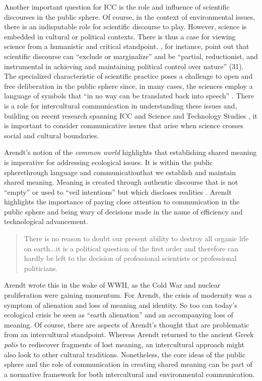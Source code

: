 Another important question for ICC is the role and influence of scientific discourses in the public sphere. Of course, in the context of environmental issues, there is an indisputable role for scientific discourse to play. However, science is embedded in cultural or political contexts. There is thus a case for viewing science from a humanistic and critical standpoint. \cite*{Peet2011}, for instance, point out that scientific discourse can ``exclude or marginalize'' and be ``partial, reductionist, and instrumental in achieving and maintaining political control over nature'' (31). The specialized characteristic of scientific practice poses a challenge to open and free deliberation in the public sphere since, in many cases, the sciences employ a language of symbols that ``in no way can be translated back into speech'' \citep[4]{Arendt1958a}. There is a role for intercultural communication in understanding these issues and, building on recent research spanning ICC and Science and Technology Studies \citep[e.g.][]{Reyes-Galindo2017a}, it is important to consider communicative issues that arise when science crosses social and cultural boundaries.  

Arendt's notion of the \textit{common world} highlights that establishing shared meaning is imperative for addressing ecological issues. It is within the public sphere\textemdash through language and communication\textemdash that we establish and maintain shared meaning. Meaning is created through authentic discourse that is not ``empty'' or used to ``veil intentions'' but which discloses realities \citep[200]{Arendt1958a}. Arendt highlights the importance of paying close attention to communication in the public sphere and being wary of decisions made in the name of efficiency and technological advancement. 

\begin{quote}
There is no reason to doubt our present ability to destroy all organic life on earth...it is a political question of the first order and therefore can hardly be left to the decision of professional scientists or professional politicians. \citep[3]{Arendt1958a} 
\end{quote}

Arendt wrote this in the wake of WWII, as the Cold War and nuclear proliferation were gaining momentum. For Arendt, the crisis of modernity was a symptom of alienation and loss of meaning and identity. So too can today's ecological crisis be seen as ``earth alienation'' and an accompanying loss of meaning. Of course, there are aspects of Arendt's thought that are problematic from an intercultural standpoint. Whereas Arendt returned to the ancient Greek \textit{polis} to rediscover fragments of lost meaning, an intercultural approach might also look to other cultural traditions. Nonetheless, the core ideas of the public sphere and the role of communication in creating shared meaning can be part of a normative framework for both intercultural and environmental communication.

